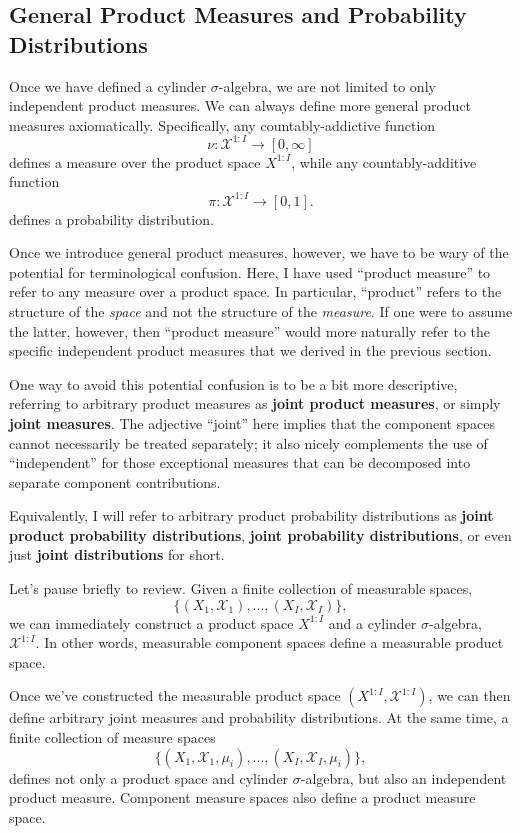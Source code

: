 \documentclass[
  letterpaper,
  DIV=11,
  numbers=noendperiod]{scrartcl}
\begin{document}
\subsection{General Product Measures and Probability
Distributions}\label{general-product-measures-and-probability-distributions}

Once we have defined a cylinder \(\sigma\)-algebra, we are not limited
to only independent product measures. We can always define more general
product measures axiomatically. Specifically, any countably-addictive
function \[
\nu : \mathcal{X}^{1:I} \rightarrow [0, \infty]
\] defines a measure over the product space \(X^{1:I}\), while any
countably-additive function \[
\pi : \mathcal{X}^{1:I} \rightarrow [0, 1].
\] defines a probability distribution.

Once we introduce general product measures, however, we have to be wary
of the potential for terminological confusion. Here, I have used
``product measure'' to refer to any measure over a product space. In
particular, ``product'' refers to the structure of the \emph{space} and
not the structure of the \emph{measure}. If one were to assume the
latter, however, then ``product measure'' would more naturally refer to
the specific independent product measures that we derived in the
previous section.

One way to avoid this potential confusion is to be a bit more
descriptive, referring to arbitrary product measures as \textbf{joint
product measures}, or simply \textbf{joint measures}. The adjective
``joint'' here implies that the component spaces cannot necessarily be
treated separately; it also nicely complements the use of
``independent'' for those exceptional measures that can be decomposed
into separate component contributions.

Equivalently, I will refer to arbitrary product probability
distributions as \textbf{joint product probability distributions},
\textbf{joint probability distributions}, or even just \textbf{joint
distributions} for short.

Let's pause briefly to review. Given a finite collection of measurable
spaces, \[
\{ ( X_{1}, \mathcal{X}_{1} ),
   ...,
   ( X_{I}, \mathcal{X}_{I} ) \},
\] we can immediately construct a product space \(X^{1:I}\) and a
cylinder \(\sigma\)-algebra, \(\mathcal{X}^{1:I}\). In other words,
measurable component spaces define a measurable product space.

Once we've constructed the measurable product space
\(( X^{1:I}, \mathcal{X}^{1:I} )\), we can then define arbitrary joint
measures and probability distributions. At the same time, a finite
collection of measure spaces \[
\{ ( X_{1}, \mathcal{X}_{1}, \mu_{i} ),
   ...,
   ( X_{I}, \mathcal{X}_{I}, \mu_{i} ) \},
\] defines not only a product space and cylinder \(\sigma\)-algebra, but
also an independent product measure. Component measure spaces also
define a product measure space.
\end{document}
